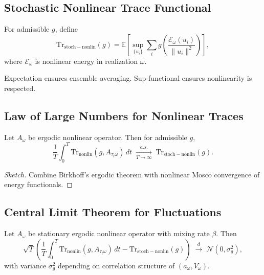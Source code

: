 \subsection{Stochastic Nonlinear Trace Functional}

\begin{definition}
For admissible $g$, define
\[
\mathrm{Tr}_{\mathrm{stoch-nonlin}}(g) = \mathbb{E}\!\left[
\sup_{\{u_i\}} \sum_i g\!\left(\frac{\mathcal{E}_\omega(u_i)}{\|u_i\|^2}\right)
\right],
\]
where $\mathcal{E}_\omega$ is nonlinear energy in realization $\omega$.  
\end{definition}

\begin{remark}
Expectation ensures ensemble averaging. Sup-functional ensures nonlinearity is respected.  
\end{remark}

\subsection{Law of Large Numbers for Nonlinear Traces}

\begin{theorem}
Let $A_\omega$ be ergodic nonlinear operator. Then for admissible $g$,
\[
\frac{1}{T}\int_0^T \mathrm{Tr}_{\mathrm{nonlin}}(g,A_{\tau_t\omega})\,dt
\;\xrightarrow[T\to\infty]{a.s.}\; \mathrm{Tr}_{\mathrm{stoch-nonlin}}(g).
\]
\end{theorem}

\begin{proof}[Sketch]
Combine Birkhoff’s ergodic theorem with nonlinear Mosco convergence of energy functionals.  
\end{proof}

\subsection{Central Limit Theorem for Fluctuations}

\begin{theorem}
Let $A_\omega$ be stationary ergodic nonlinear operator with mixing rate $\beta$.  
Then
\[
\sqrt{T}\left(
\frac{1}{T}\int_0^T \mathrm{Tr}_{\mathrm{nonlin}}(g,A_{\tau_t\omega})\,dt
- \mathrm{Tr}_{\mathrm{stoch-nonlin}}(g)\right)
\;\xrightarrow{d}\; \mathcal{N}(0,\sigma_g^2),
\]
with variance $\sigma_g^2$ depending on correlation structure of $(a_\omega,V_\omega)$.  
\end{theorem}


